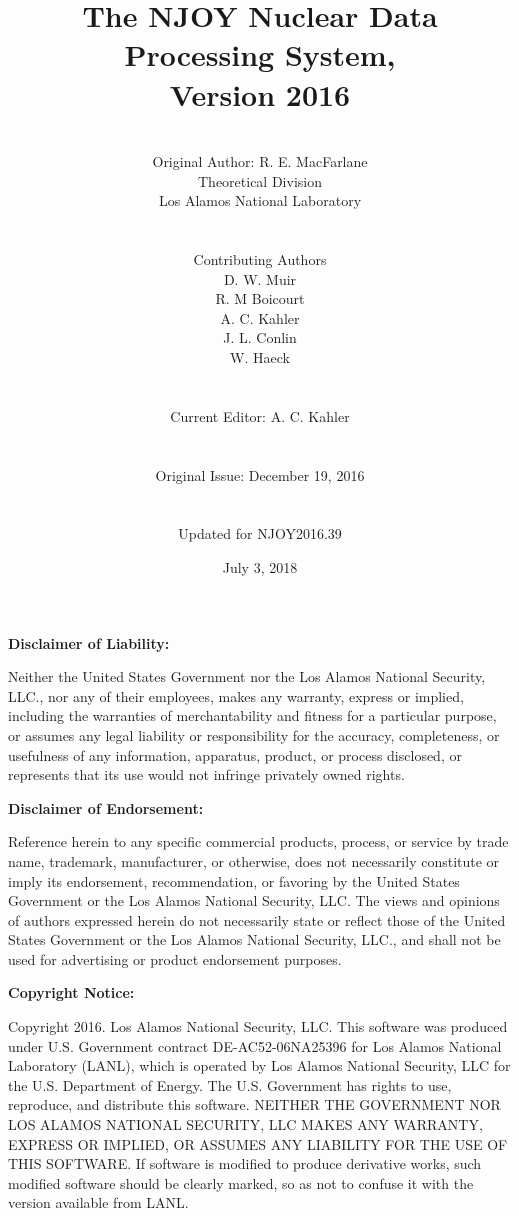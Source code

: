 \documentclass[11pt,twoside]{NJOYMan}
\title{\bf The NJOY Nuclear Data Processing System,\\Version 2016}
\author{\\
  Original Author:  R. E. MacFarlane\\
  Theoretical Division\\
  Los Alamos National Laboratory\\
\\
\\
Contributing Authors\\
D. W. Muir\\
R. M Boicourt\\
A. C. Kahler\\
J. L. Conlin\\
W. Haeck\\
\\
\\
Current Editor:  A. C. Kahler\\
\\
\\
Original Issue:  December 19, 2016\\
\\
\\
Updated for NJOY2016.39
\\}
\date{July 3, 2018}
\renewcommand{\headrulewidth}{0pt}     %
\renewcommand{\footrulewidth}{0pt}}    %
\begin{document}
\maketitle
{}

\clearpage
\fancyhf{}                           %
%
\renewcommand{\headrulewidth}{0pt}   %
\renewcommand{\footrulewidth}{0pt}   %

%
\begin{center} \textbf{Disclaimer of Liability:} \end{center}
Neither the United States Government nor the Los Alamos
National Security, LLC., nor any of their employees, makes any warranty,
express or implied, including the warranties of merchantability and
fitness for a particular purpose, or assumes any legal liability or
responsibility for the accuracy, completeness, or usefulness of any
information, apparatus, product, or process disclosed, or represents
that its use would not infringe privately owned rights.

\vspace{0.25in}
\begin{center} \textbf{Disclaimer of Endorsement:} \end{center}
Reference herein to any specific commercial products,
process, or service by trade name, trademark, manufacturer, or otherwise,
does not necessarily constitute or imply its endorsement, recommendation,
or favoring by the United States Government or the Los Alamos National
Security, LLC. The views and opinions of authors expressed herein do not
necessarily state or reflect those of the United States Government or
the Los Alamos National Security, LLC., and shall not be used for
advertising or product endorsement purposes.

\vspace{0.25in}
\begin{center} \textbf{Copyright Notice:} \end{center}
Copyright 2016. Los Alamos National Security, LLC. This software was
produced under U.S. Government contract DE-AC52-06NA25396 for
Los Alamos National Laboratory (LANL), which is operated by
Los Alamos National Security, LLC for the U.S. Department of
Energy. The U.S. Government has rights to use, reproduce, and
distribute this software.  NEITHER THE GOVERNMENT NOR LOS ALAMOS
NATIONAL SECURITY, LLC MAKES ANY WARRANTY, EXPRESS OR IMPLIED, OR
ASSUMES ANY LIABILITY FOR THE USE OF THIS SOFTWARE.  If software
is modified to produce derivative works, such modified software
should be clearly marked, so as not to confuse it with the version
available from LANL.
\end{document}
